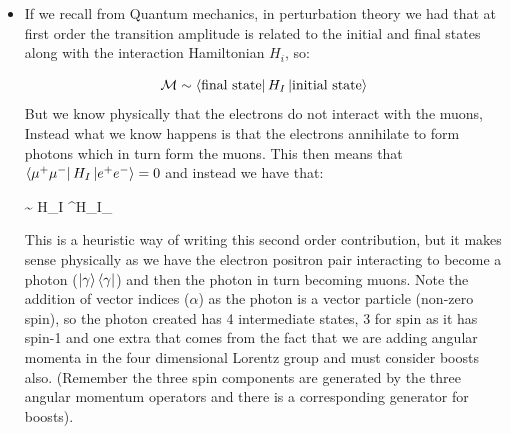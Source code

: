 \documentclass[11pt]{article}
\renewenvironment{flalign}{\vspace{-3mm}\empheq[box=\tcbhighmath]{align}}{\endempheq}
\numberwithin{equation}{section}
\begin{document}
\begin{itemize}
  \item If we recall from Quantum mechanics, in perturbation theory we had that at first order the transition amplitude is related to the initial and final states along with the interaction Hamiltonian $H_i$, so:

\begin{equation*}
  \mathcal{M} \sim \bra{\text{final state}} H_I \ket{\text{initial state}}
\end{equation*}
But we know physically that the electrons do not interact with the muons, Instead what we know happens is that the electrons annihilate to form photons which in turn form the muons. This then means that $\bra{\mu^+ \mu^-} H_I \ket{e^+e^-} = 0 $ and instead we have that:

\begin{flalign}
\label{second order M}
   \sim \bra{\mu^+ \mu^-} H_I \ket{\gamma}^{\alpha}\bra{\gamma}H_I_{\alpha}
\end{flalign}

This is a heuristic way of writing this second order contribution, but it makes sense physically as we have the electron positron pair interacting to become a photon ($\ket{\gamma}\bra{\gamma}$) and then the photon in turn becoming muons. Note the addition of vector indices ($\alpha$) as the photon is a vector particle (non-zero spin), so the photon created has 4 intermediate states, 3 for spin as it has spin-1 and one extra that comes from the fact that we are adding angular momenta in the four dimensional Lorentz group and must consider boosts also. (Remember the three spin components are generated by the three angular momentum operators and there is a corresponding generator for boosts). 
\end{itemize}
\end{document}
